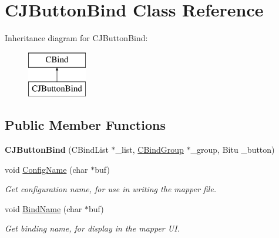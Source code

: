 \hypertarget{classCJButtonBind}{\section{C\-J\-Button\-Bind Class Reference}
\label{classCJButtonBind}
}
Inheritance diagram for C\-J\-Button\-Bind\-:\begin{figure}[H]
\begin{center}
\leavevmode
\includegraphics[height=2.000000cm]{classCJButtonBind}
\end{center}
\end{figure}
\subsection*{Public Member Functions}
\begin{DoxyCompactItemize}
\item 
\hypertarget{classCJButtonBind_a087e9681558df38907c7d57a373ec115}{{\bfseries C\-J\-Button\-Bind} (C\-Bind\-List $\ast$\-\_\-list, \hyperlink{classCBindGroup}{C\-Bind\-Group} $\ast$\-\_\-group, Bitu \-\_\-button)}\label{classCJButtonBind_a087e9681558df38907c7d57a373ec115}

\item 
\hypertarget{classCJButtonBind_a0aae6d69719dfb37dc2e1ed722663ec0}{void \hyperlink{classCJButtonBind_a0aae6d69719dfb37dc2e1ed722663ec0}{Config\-Name} (char $\ast$buf)}\label{classCJButtonBind_a0aae6d69719dfb37dc2e1ed722663ec0}

\begin{DoxyCompactList}\small\item\em Get configuration name, for use in writing the mapper file. \end{DoxyCompactList}\item 
\hypertarget{classCJButtonBind_a948fa272e3164f85522f7b1ece2ae49f}{void \hyperlink{classCJButtonBind_a948fa272e3164f85522f7b1ece2ae49f}{Bind\-Name} (char $\ast$buf)}\label{classCJButtonBind_a948fa272e3164f85522f7b1ece2ae49f}

\begin{DoxyCompactList}\small\item\em Get binding name, for display in the mapper U\-I. \end{DoxyCompactList}\end{DoxyCompactItemize}
